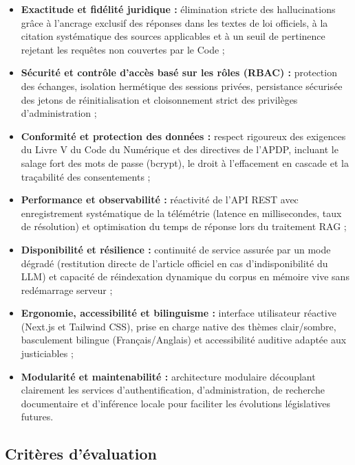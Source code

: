 \begin{itemize}
    \item \textbf{Exactitude et fidélité juridique :} élimination stricte des hallucinations grâce à l'ancrage exclusif des réponses dans les textes de loi officiels, à la citation systématique des sources applicables et à un seuil de pertinence rejetant les requêtes non couvertes par le Code ;
    
    \item \textbf{Sécurité et contrôle d'accès basé sur les rôles (RBAC) :} protection des échanges, isolation hermétique des sessions privées, persistance sécurisée des jetons de réinitialisation et cloisonnement strict des privilèges d'administration ;
    
    \item \textbf{Conformité et protection des données :} respect rigoureux des exigences du Livre V du Code du Numérique et des directives de l'APDP, incluant le salage fort des mots de passe (bcrypt), le droit à l'effacement en cascade et la traçabilité des consentements ;
    
    \item \textbf{Performance et observabilité :} réactivité de l'API REST avec enregistrement systématique de la télémétrie (latence en millisecondes, taux de résolution) et optimisation du temps de réponse lors du traitement RAG ;
    
    \item \textbf{Disponibilité et résilience :} continuité de service assurée par un mode dégradé (restitution directe de l'article officiel en cas d'indisponibilité du LLM) et capacité de réindexation dynamique du corpus en mémoire vive sans redémarrage serveur ;
    
    \item \textbf{Ergonomie, accessibilité et bilinguisme :} interface utilisateur réactive (Next.js et Tailwind CSS), prise en charge native des thèmes clair/sombre, basculement bilingue (Français/Anglais) et accessibilité auditive adaptée aux justiciables ;
    
    \item \textbf{Modularité et maintenabilité :} architecture modulaire découplant clairement les services d'authentification, d'administration, de recherche documentaire et d'inférence locale pour faciliter les évolutions législatives futures.
\end{itemize}

\subsection{Critères d'évaluation}

